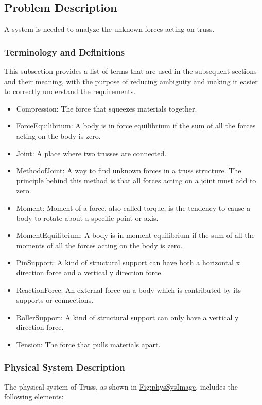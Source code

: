 \documentclass[12pt]{article}
\begin{document}
\subsection{Problem Description}
\label{Sec:ProbDesc}
A system is needed to analyze the unknown forces acting on truss.

\subsubsection{Terminology and Definitions}
\label{Sec:TermDefs}
This subsection provides a list of terms that are used in the subsequent sections and their meaning, with the purpose of reducing ambiguity and making it easier to correctly understand the requirements.

\begin{itemize}
\item{Compression: The force that squeezes materials together.}
\item{ForceEquilibrium: A body is in force equilibrium if the sum of all the forces acting on the body is zero.}
\item{Joint: A place where two trusses are connected.}
\item{MethodofJoint: A way to find unknown forces in a truss structure. The principle behind this method is that all forces acting on a joint must add to zero.}
\item{Moment: Moment of a force, also called torque, is the tendency to cause a body to rotate about a specific point or axis.}
\item{MomentEquilibrium: A body is in moment equilibrium if the sum of all the moments of all the forces acting on the body is zero.}
\item{PinSupport: A kind of structural support can have both a horizontal x direction force and a vertical y direction force.}
\item{ReactionForce: An external force on a body which is contributed by its supports or connections.}
\item{RollerSupport: A kind of structural support can only have a vertical y direction force.}
\item{Tension: The force that pulls materials apart.}
\end{itemize}
\subsubsection{Physical System Description}
\label{Sec:PhysSyst}
The physical system of Truss, as shown in \hyperref[Figure:physSysImage]{Fig:physSysImage}, includes the following elements:
\end{document}
